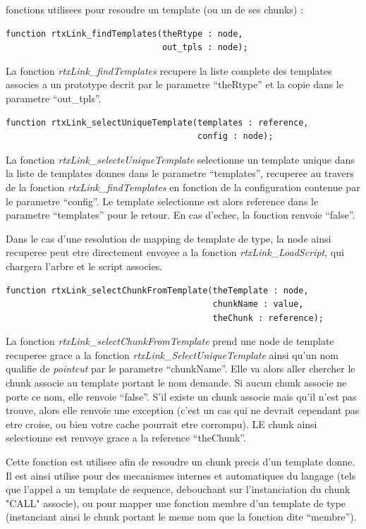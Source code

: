 \documentclass[french]{rtxreport}
\begin{document}
\begin{enumerate}
\vspace{}

fonctions utilisees pour resoudre un template (ou un de ses chunks) :
\begin{lstlisting}
function rtxLink_findTemplates(theRtype : node,
                               out_tpls : node);
\end{lstlisting}
La fonction \emph{rtxLink\_findTemplates} recupere la liste complete des
templates associes a un prototype decrit par le parametre ``theRtype'' et la
copie dans le parametre ``out\_tpls''.

\begin{lstlisting}
function rtxLink_selectUniqueTemplate(templates : reference,
                                      config : node);
\end{lstlisting}
La fonction \emph{rtxLink\_selecteUniqueTemplate} selectionne un template
unique dans la liste de templates donnes dans le parametre ``templates'',
recuperee au travers de la fonction \emph{rtxLink\_findTemplates} en fonction
de la configuration contenue par le parametre ``config''. Le template
selectionne est alors reference dans le parametre ``templates'' pour le retour.
En cas d'echec, la fonction renvoie ``false''.

Dans le cas d'une resolution de mapping de template de type, la node ainsi
recuperee peut etre directement envoyee a la fonction
\emph{rtxLink\_LoadScript}, qui chargera l'arbre et le script associes.

\begin{lstlisting}
function rtxLink_selectChunkFromTemplate(theTemplate : node,
                                         chunkName : value,
                                         theChunk : reference);
\end{lstlisting}
La fonction \emph{rtxLink\_selectChunkFromTemplate} prend une node de template
recuperee grace a la fonction \emph{rtxLink\_SelectUniqueTemplate} ainsi qu'un
nom qualifie de \emph{pointcut} par le parametre ``chunkName''. Elle va alors
aller chercher le chunk associe au template portant le nom demande. Si aucun
chunk associe ne porte ce nom, elle renvoie ``false''. S'il existe un chunk
associe mais qu'il n'est pas trouve, alors elle renvoie une exception (c'est un
cas qui ne devrait cependant pas etre croise, ou bien votre cache pourrait etre
corrompu). LE chunk ainsi selectionne est renvoye grace a la reference
``theChunk''.

Cette fonction est utilisee afin de resoudre un chunk precis d'un template
donne. Il est ainsi utilise pour des mecanismes internes et automatiques du
langage (tels que l'appel a un template de sequence, debouchant sur
l'instanciation du chunk "CALL" associe), ou pour mapper une fonction membre
d'un template de type (instanciant ainsi le chunk portant le meme nom que la
fonction dite ``membre'').


\end{enumerate}
\end{document}
